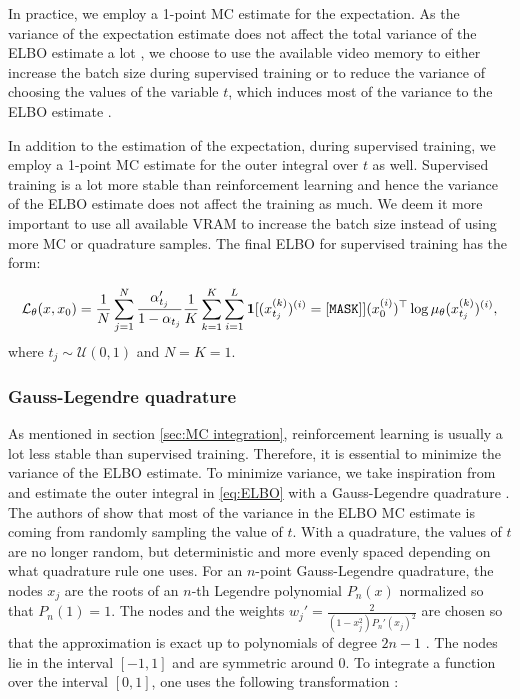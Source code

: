 In practice, we employ a 1-point MC estimate for the expectation. As the variance of the expectation estimate does not affect the total variance of the ELBO estimate a lot \cite{rojas2025improvingreasoningdiffusionlanguage}, we choose to use the available video memory to either increase the batch size during supervised training or to reduce the variance of choosing the values of the variable $t$, which induces most of the variance to the ELBO estimate \cite{rojas2025improvingreasoningdiffusionlanguage}.

In addition to the estimation of the expectation, during supervised training, we employ a 1-point MC estimate for the outer integral over $t$ as well. Supervised training is a lot more stable than reinforcement learning and hence the variance of the ELBO estimate does not affect the training as much. We deem it more important to use all available VRAM to increase the batch size instead of using more MC or quadrature samples. The final ELBO for supervised training has the form:

\begin{equation*}
    \mathcal{L}_\theta(x, x_0) = \frac{1}{N}\sum_{j=1}^{N}\frac{\alpha_{t_j}'}{1 - \alpha_{t_j}}\frac{1}{K}\sum_{k=1}^{K}\sum_{i=1}^{L}\bold{1}[(x_{t_j}^{(k)})^{(i)} = [\mathtt{MASK}]](x_0^{(i)})^\top\log\mu_\theta(x_{t_j}^{(k)})^{(i)},
    \label{eq:supervised ELBO}
\end{equation*}
where $t_j\sim\mathcal{U}(0, 1)$ and $N = K = 1$.

\subsubsection{Gauss-Legendre quadrature}
\label{sec:gauss-legendre quadrature}

As mentioned in section \ref{sec:MC integration}, reinforcement learning is usually a lot less stable than supervised training. Therefore, it is essential to minimize the variance of the ELBO estimate. To minimize variance, we take inspiration from \cite{rojas2025improvingreasoningdiffusionlanguage} and estimate the outer integral in \eqref{eq:ELBO} with a Gauss-Legendre quadrature \cite{methodsofnumericalintegration}. The authors of \cite{rojas2025improvingreasoningdiffusionlanguage} show that most of the variance in the ELBO MC estimate is coming from randomly sampling the value of $t$. With a quadrature, the values of $t$ are no longer random, but deterministic and more evenly spaced depending on what quadrature rule one uses. For an $n$-point Gauss-Legendre quadrature, the nodes $x_j$ are the roots of an $n$-th Legendre polynomial $P_n(x)$ normalized so that $P_n(1) = 1$. The nodes and the weights $w_j' = \frac{2}{(1 - x_j^2)P_n'(x_j)^2}$ are chosen so that the approximation is exact up to polynomials of degree $2n - 1$ \cite{methodsofnumericalintegration}. The nodes lie in the interval $[-1, 1]$ and are symmetric around 0. To integrate a function over the interval $[0, 1]$, one uses the following transformation \cite{numericalmethodsinscientificcomputing}:

